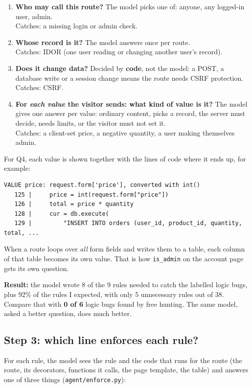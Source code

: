 \documentclass[11pt,a4paper]{article}
\newcommand{\code}[1]{\texttt{#1}}
\begin{document}
\begin{enumerate}[label=\textbf{Q\arabic*},leftmargin=2.4em,itemsep=4pt]
  \item \textbf{Who may call this route?} The model picks one of: anyone, any logged-in user, admin.\\
        {\color{grey}Catches:} a missing login or admin check.
  \item \textbf{Whose record is it?} The model answers once per route.\\
        {\color{grey}Catches:} IDOR (one user reading or changing another user's record).
  \item \textbf{Does it change data?} Decided by \textbf{code}, not the model: a POST, a database write or a
        session change means the route needs CSRF protection.\\
        {\color{grey}Catches:} CSRF.
  \item \textbf{For \emph{each value} the visitor sends: what kind of value is it?} The model gives one answer per
        value: ordinary content, picks a record, the server must decide, needs limits, or the visitor must not set it.\\
        {\color{grey}Catches:} a client-set price, a negative quantity, a user making themselves admin.
\end{enumerate}

For Q4, each value is shown together with the lines of code where it ends up, for example:

\begin{lstlisting}
VALUE price: request.form['price'], converted with int()
   125 |     price = int(request.form["price"])
   126 |     total = price * quantity
   128 |     cur = db.execute(
   129 |         "INSERT INTO orders (user_id, product_id, quantity, total, ...
\end{lstlisting}

When a route loops over \emph{all} form fields and writes them to a table, each column of that table becomes
its own value. That is how \code{is\_admin} on the account page gets its own question.

\textbf{Result:} the model wrote 8 of the 9 rules needed to catch the labelled logic bugs, plus 92\% of the
rules I expected, with only 5 unnecessary rules out of 38. Compare that with \textbf{0 of 6} logic bugs found
by free hunting. The same model, asked a better question, does much better.

\subsection{Step 3: which line enforces each rule?}
For each rule, the model sees the rule and the code that runs for the route (the route, its decorators,
functions it calls, the page template, the table) and answers one of three things
(\code{agent/enforce.py}):
\end{document}
